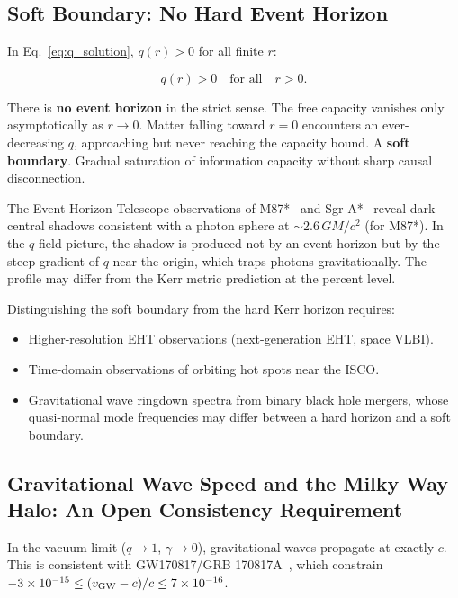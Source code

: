 \documentclass[aps,prd,twocolumn,showpacs,superscriptaddress,preprintnumbers]{revtex4-2}
\begin{document}
\subsection{Soft Boundary: No Hard Event Horizon}

In Eq.~\eqref{eq:q_solution}, $q(r)>0$ for all finite $r$:

\begin{equation}
q(r) > 0 \quad \text{for all} \quad r > 0.
\label{eq:soft}
\end{equation}

There is \textbf{no event horizon} in the strict sense.
The free capacity vanishes only asymptotically as $r\to0$.
Matter falling toward $r=0$ encounters an ever-decreasing $q$, approaching but never reaching the capacity bound.
A \textbf{soft boundary}. Gradual saturation of information capacity without sharp causal disconnection.

The Event Horizon Telescope observations of M87*~\cite{EventHorizonTelescope:2019dse} and Sgr A*~\cite{EventHorizonTelescope:2022xnr} reveal dark central shadows consistent with a photon sphere at $\sim2.6\,GM/c^2$ (for M87*).
In the $q$-field picture, the shadow is produced not by an event horizon but by the steep gradient of $q$ near the origin, which traps photons gravitationally.
The profile may differ from the Kerr metric prediction at the percent level.

Distinguishing the soft boundary from the hard Kerr horizon requires:
\begin{itemize}
    \item Higher-resolution EHT observations (next-generation EHT, space VLBI).
    \item Time-domain observations of orbiting hot spots near the ISCO.
    \item Gravitational wave ringdown spectra from binary black hole mergers, whose quasi-normal mode frequencies may differ between a hard horizon and a soft boundary.
\end{itemize}

\subsection{Gravitational Wave Speed and the Milky Way Halo: An Open Consistency Requirement}
\label{sec:gw170817_halo}

In the vacuum limit ($q\to1$, $\gamma\to0$), gravitational waves propagate at exactly $c$.
This is consistent with GW170817/GRB 170817A~\cite{Abbott:2017apx,GW170817grb}, which constrain $-3\times10^{-15}\leq(v_{\rm GW}-c)/c\leq7\times10^{-16}$.
\end{document}

